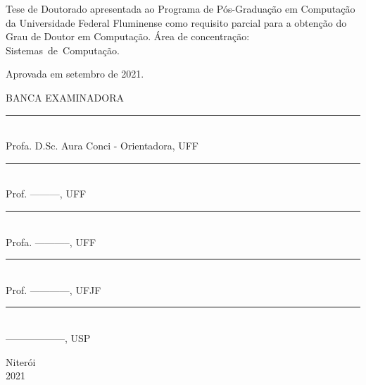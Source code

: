 \noindent
\begin{flushright}
\begin{minipage}[t]{8cm}

Tese de Doutorado apresentada ao Programa de Pós-Graduação em Computação da Universidade Federal Fluminense como requisito parcial para a obtenção do \mbox{Grau} de Doutor em Computação. Área de concentração: \mbox{Sistemas de Computação.} %
\end{minipage}
\end{flushright}
\vspace{1.0 cm}
\noindent
Aprovada em setembro de 2021. \\
\begin{flushright}
  \parbox{10cm}
  {
  \begin{center}
  BANCA EXAMINADORA \\
  \vspace{6mm}
  \rule{11cm}{.1mm} \\
    Profa. D.Sc. Aura Conci - Orientadora, UFF \\
    \vspace{6mm}
  \rule{11cm}{.1mm} \\
     Prof. ---------, UFF \\
   \vspace{6mm}

  \rule{11cm}{.1mm} \\
    Profa. -----------, UFF\\
    \vspace{4mm}
  \rule{11cm}{.1mm} \\
    Prof. ------------, UFJF\\
  \vspace{4mm}
  \rule{11cm}{.1mm} \\
   ------------------, USP \\
  \end{center}
  }
\end{flushright}
\begin{center}
  Niterói \\
  2021

\end{center}

\cleardoublepage
\thispagestyle{empty}
\vspace*{200mm}

